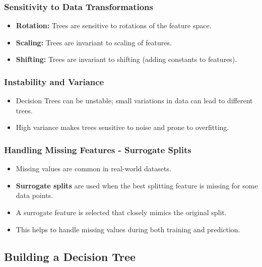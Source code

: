 \documentclass{article}
\begin{document}
\subsubsection{Sensitivity to Data Transformations}

\begin{itemize}
    \item \textbf{Rotation:} Trees are sensitive to rotations of the feature space.
    \item \textbf{Scaling:} Trees are invariant to scaling of features.
    \item \textbf{Shifting:} Trees are invariant to shifting (adding constants to features).
\end{itemize}

\subsubsection{Instability and Variance}

\begin{itemize}
    \item Decision Trees can be unstable; small variations in data can lead to different trees.
    \item High variance makes trees sensitive to noise and prone to overfitting.
\end{itemize}

\subsubsection{Handling Missing Features - Surrogate Splits}

\begin{itemize}
    \item Missing values are common in real-world datasets.
    \item \textbf{Surrogate splits} are used when the best splitting feature is missing for some data points.
    \item A surrogate feature is selected that closely mimics the original split.
    \item This helps to handle missing values during both training and prediction.
\end{itemize}

\subsection{Building a Decision Tree}
\end{document}
